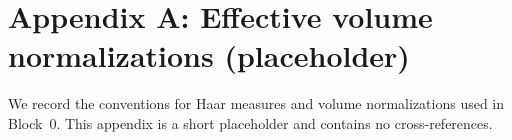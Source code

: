 \section*{Appendix A: Effective volume normalizations (placeholder)}
We record the conventions for Haar measures and volume normalizations used in Block~0.
This appendix is a short placeholder and contains no cross-references.
